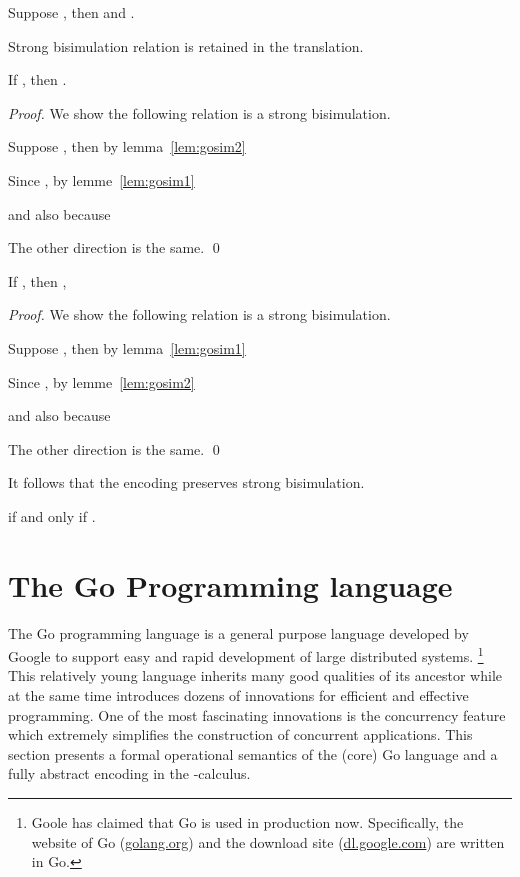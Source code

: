\documentclass[runningheads, envcountsame, a4paper]{llncs}
\begin{document}
\begin{lemma}
  Suppose , then  and .
  \label{lem:gosim2}
\end{lemma}

Strong bisimulation relation is retained in the translation.

\begin{lemma}
  If , then .
  \label{lem:complete}
\end{lemma}
\begin{proof}
  We show the following relation  is a strong bisimulation.
  
  Suppose , then by lemma~\ref{lem:gosim2}
  
  Since , by lemme~\ref{lem:gosim1}
  
  and also  because 

  The other direction is the same. \qed
\end{proof}

\begin{lemma}
  If , then ,
  \label{lem:sound}
\end{lemma}
\begin{proof}
  We show the following relation  is a strong bisimulation.
  
  Suppose , then by lemma~\ref{lem:gosim1}
  
  Since , by lemme~\ref{lem:gosim2}
  
  and also  because 

  The other direction is the same. \qed
\end{proof}

It follows that the encoding preserves strong bisimulation.
\begin{theorem}
   if and only if .
\end{theorem}




\section{The Go Programming language}
\label{sec:go}

The Go programming language is a general purpose language developed by Google to support
easy and rapid development of large distributed systems.
\footnote{Goole has claimed that Go is used in production now.
Specifically, the website of Go (\url{golang.org}) and the download site (\url{dl.google.com}) are written in Go.}
This relatively young language inherits many good qualities of its ancestor while at the same time
introduces dozens of innovations for efficient and effective programming.
One of the most fascinating innovations is the concurrency feature which extremely simplifies
the construction of concurrent applications.
This section presents a formal operational semantics of the (core) Go language and a fully abstract
encoding in the -calculus.
\end{document}
